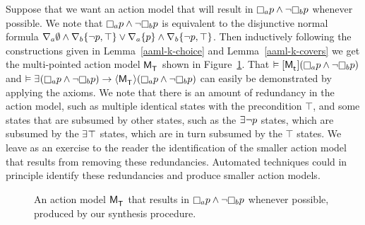 \begin{example}
Suppose that we want an action model that will result in $\necessaryA \atomP \land \lnot \necessaryB \atomP$ whenever possible.
We note that $\necessaryA \atomP \land \lnot \necessaryB \atomP$ is equivalent to the disjunctive normal formula $\nabla_{a} \emptyset \land \nabla_{b} \{\lnot p, \top\} \lor \nabla_{a} \{p\} \land \nabla_{b} \{\lnot p, \top\}$.
Then inductively following the constructions given in Lemma~\ref{aaml-k-choice} and Lemma~\ref{aaml-k-covers} we get the multi-pointed action model $\aPModel{\aStatesT}$ shown in Figure~\ref{aaml-k-example}.
That $\entails \actionA{\aPModel{\aStateT}} (\necessaryA \atomP \land \lnot \necessaryB \atomP)$ and $\entails \somerefs (\necessaryA \atomP \land \lnot \necessaryB \atomP) \implies \actionE{\aPModel{\aStatesT}} (\necessaryA \atomP \land \lnot \necessaryB \atomP)$ can easily be demonstrated by applying the \axiomAmlK{} axioms.
We note that there is an amount of redundancy in the action model, such as multiple identical states with the precondition $\top$, and some states that are subsumed by other states, such as the $\someacts \lnot \atomP$ states, which are subsumed by the $\someacts \top$ states, which are in turn subsumed by the $\top$ states.
We leave as an exercise to the reader the identification of the smaller action model that results from removing these redundancies.
Automated techniques could in principle identify these redundancies and produce smaller action models.

\begin{figure}[b!]
    \caption{An action model $\aPModel{\aStatesT}$ that results in $\necessaryA \atomP \land \lnot \necessaryB \atomP$ whenever possible, produced by our synthesis procedure.}\label{aaml-k-example}
    \centering
\end{figure}
\end{example}
